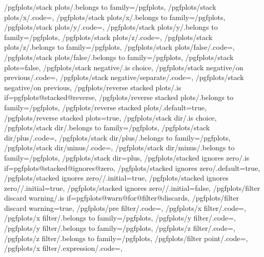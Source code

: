 {	/pgfplots/stack plots/.belongs to family=/pgfplots,
	/pgfplots/stack plots/x/.code={\def\pgfplots@stacked@dir{x}\pgfplots@stackedmodetrue},
	/pgfplots/stack plots/x/.belongs to family=/pgfplots,
	/pgfplots/stack plots/y/.code={\def\pgfplots@stacked@dir{y}\pgfplots@stackedmodetrue},
	/pgfplots/stack plots/y/.belongs to family=/pgfplots,
	/pgfplots/stack plots/z/.code={\def\pgfplots@stacked@dir{z}\pgfplots@stackedmodetrue},
	/pgfplots/stack plots/z/.belongs to family=/pgfplots,
	/pgfplots/stack plots/false/.code={\pgfplots@stackedmodefalse},
	/pgfplots/stack plots/false/.belongs to family=/pgfplots,
	/pgfplots/stack plots=false,
	/pgfplots/stack negative/.is choice,
	/pgfplots/stack negative/on previous/.code={\def\pgfplots@stacked@negative@mode{P}},
	/pgfplots/stack negative/separate/.code={\def\pgfplots@stacked@negative@mode{S}},
	/pgfplots/stack negative/on previous,
	/pgfplots/reverse stacked plots/.is if=pgfplots@stacked@reverse,
	/pgfplots/reverse stacked plots/.belongs to family=/pgfplots,
	/pgfplots/reverse stacked plots/.default=true,
	/pgfplots/reverse stacked plots=true,
	/pgfplots/stack dir/.is choice,
	/pgfplots/stack dir/.belongs to family=/pgfplots,
	/pgfplots/stack dir/plus/.code={\pgfplots@stacked@plustrue},
	/pgfplots/stack dir/plus/.belongs to family=/pgfplots,
	/pgfplots/stack dir/minus/.code={\pgfplots@stacked@plusfalse},
	/pgfplots/stack dir/minus/.belongs to family=/pgfplots,
	/pgfplots/stack dir=plus,
	/pgfplots/stacked ignores zero/.is if=pgfplots@stacked@ignores@zero,
	/pgfplots/stacked ignores zero/.default=true,
	/pgfplots/stacked ignores zero/\pgfplotsaxis@visphase@name@default/.initial=true,
	/pgfplots/stacked ignores zero/\pgfplotsaxis@visphase@name@markers/.initial=true,
	/pgfplots/stacked ignores zero/\pgfplotsaxis@visphase@name@errorbars/.initial=false,
	/pgfplots/filter discard warning/.is if=pgfplots@warn@for@filter@discards,
	/pgfplots/filter discard warning=true,
	/pgfplots/pre filter/.code={},
	/pgfplots/x filter/.code={},
	/pgfplots/x filter/.belongs to family=/pgfplots,
	/pgfplots/y filter/.code={},
	/pgfplots/y filter/.belongs to family=/pgfplots,
	/pgfplots/z filter/.code={},
	/pgfplots/z filter/.belongs to family=/pgfplots,
	/pgfplots/filter point/.code=,
	/pgfplots/x filter/.expression/.code=,
}
